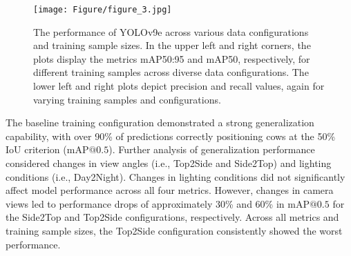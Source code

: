 \begin{figure}[h]
    \centering
    \texttt{[image: Figure/figure\_3.jpg]}
    \caption{The performance of YOLOv9e across various data configurations and training sample sizes. In the upper left and right corners, the plots display the metrics mAP50:95 and mAP50, respectively, for different training samples across diverse data configurations. The lower left and right plots depict precision and recall values, again for varying training samples and configurations.}
    \label{fig:schemes}
    \end{figure}
The baseline training configuration demonstrated a strong generalization capability, with over 90\% of predictions correctly positioning cows at the 50\% IoU criterion ($\text{mAP@{0.5}}$). Further analysis of generalization performance considered changes in view angles (i.e., Top2Side and Side2Top) and lighting conditions (i.e., Day2Night). Changes in lighting conditions did not significantly affect model performance across all four metrics. However, changes in camera views led to performance drops of approximately 30\% and 60\% in $\text{mAP@{0.5}}$ for the Side2Top and Top2Side configurations, respectively. Across all metrics and training sample sizes, the Top2Side configuration consistently showed the worst performance.

